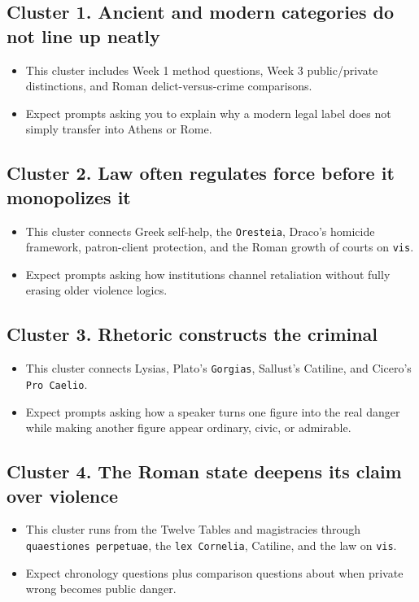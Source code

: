 \documentclass[11pt]{article}
\begin{document}
\subsection{Cluster 1. Ancient and modern categories do not line up neatly}

\begin{itemize}
\item This cluster includes Week 1 method questions, Week 3 public/private distinctions, and Roman delict-versus-crime comparisons.
\item Expect prompts asking you to explain why a modern legal label does not simply transfer into Athens or Rome.
\end{itemize}

\subsection{Cluster 2. Law often regulates force before it monopolizes it}

\begin{itemize}
\item This cluster connects Greek self-help, the \texttt{Oresteia}, Draco's homicide framework, patron-client protection, and the Roman growth of courts on \texttt{vis}.
\item Expect prompts asking how institutions channel retaliation without fully erasing older violence logics.
\end{itemize}

\subsection{Cluster 3. Rhetoric constructs the criminal}

\begin{itemize}
\item This cluster connects Lysias, Plato's \texttt{Gorgias}, Sallust's Catiline, and Cicero's \texttt{Pro Caelio}.
\item Expect prompts asking how a speaker turns one figure into the real danger while making another figure appear ordinary, civic, or admirable.
\end{itemize}

\subsection{Cluster 4. The Roman state deepens its claim over violence}

\begin{itemize}
\item This cluster runs from the Twelve Tables and magistracies through \texttt{quaestiones perpetuae}, the \texttt{lex Cornelia}, Catiline, and the law on \texttt{vis}.
\item Expect chronology questions plus comparison questions about when private wrong becomes public danger.
\end{itemize}
\end{document}
